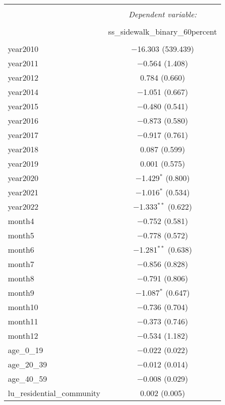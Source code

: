 \begin{table}[!htbp] \centering 
  \caption{} 
  \label{} 
\small 
\begin{tabular}{@{\extracolsep{1pt}}lc} 
\\[-1.8ex]\hline 
\hline \\[-1.8ex] 
 & \multicolumn{1}{c}{\textit{Dependent variable:}} \\ 
\cline{2-2} 
\\[-1.8ex] & ss\_sidewalk\_binary\_60percent \\ 
\hline \\[-1.8ex] 
 year2010 & $-$16.303 (539.439) \\ 
  year2011 & $-$0.564 (1.408) \\ 
  year2012 & 0.784 (0.660) \\ 
  year2014 & $-$1.051 (0.667) \\ 
  year2015 & $-$0.480 (0.541) \\ 
  year2016 & $-$0.873 (0.580) \\ 
  year2017 & $-$0.917 (0.761) \\ 
  year2018 & 0.087 (0.599) \\ 
  year2019 & 0.001 (0.575) \\ 
  year2020 & $-$1.429$^{*}$ (0.800) \\ 
  year2021 & $-$1.016$^{*}$ (0.534) \\ 
  year2022 & $-$1.333$^{**}$ (0.622) \\ 
  month4 & $-$0.752 (0.581) \\ 
  month5 & $-$0.778 (0.572) \\ 
  month6 & $-$1.281$^{**}$ (0.638) \\ 
  month7 & $-$0.856 (0.828) \\ 
  month8 & $-$0.791 (0.806) \\ 
  month9 & $-$1.087$^{*}$ (0.647) \\ 
  month10 & $-$0.736 (0.704) \\ 
  month11 & $-$0.373 (0.746) \\ 
  month12 & $-$0.534 (1.182) \\ 
  age\_0\_19 & $-$0.022 (0.022) \\ 
  age\_20\_39 & $-$0.012 (0.014) \\ 
  age\_40\_59 & $-$0.008 (0.029) \\ 
  lu\_residential\_community & 0.002 (0.005) \\ 

\end{tabular}
\end{table}
